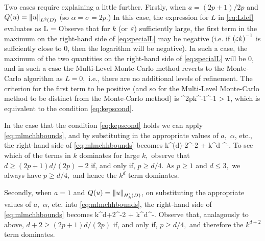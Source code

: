 Two cases require explaining a little further. Firstly, when $a=(2p+1)/2p$ and $Q(u) = \NLtD{u}$ (so $\alpha = \sigma = 2p.$) In this case, the expression for $L$ in \cref{eq:Ldef} evaluates as
  \beq\label{eq:specialL}
  L = \max{}
\eeq
Observe that for $k$ (or $\varepsilon$) sufficiently large, the first term in the maximum on the right-hand side of \cref{eq:specialL} may be negative (i.e. if $\mleft(\eps k\mright)^{-1}$ is suffciently close to 0, then the logarithm will be negative). In such a case, the maximum of the two quantities on the right-hand side of \cref{eq:specialL} will be 0, and in such a case the Multi-Level Monte-Carlo method reverts to the Monte-Carlo algorithm as $L=0,$ i.e., there are no additional levels of refinement. The criterion for the first term to be positive (and so for the Multi-Level Monte-Carlo method to be distinct from the Monte-Carlo method) is
\beqs
{}\co\Ccoarse^{2p}k^{-1}\eps^{-1} > 1,
\eeqs
which is equivalent to the condition \cref{eq:kepscond}.

In the case that the condition \cref{eq:kepscond} holds we can apply \cref{eq:mlmchhbounds}, and by substituting in the appropriate values of $a,$ $\alpha$, etc., the right-hand side of \cref{eq:mlmchhbounds} becomes
\beqs
k^{\mleft(d\mright)-2}\eps^{-2} + k^d \eps^{-}.
\eeqs
To see which of the terms in $k$ dominates for large $k,$ observe that $d \geq (2p+1)d/(2p) -2 $ if, and only if, $p \geq d/4.$ As $p \geq 1$ and $d \leq 3,$ we always have $p \geq d/4,$ and hence the $k^d$ term dominates.

Secondly, when $a=1$ and $Q(u) = \NHokD{u}$, on substituting the appropriate values of $a,$ $\alpha$, etc. into \cref{eq:mlmchhbounds}, the right-hand side of \cref{eq:mlmchhbounds} becomes
\beqs
k^{d+2}\eps^{-2} + k^{d}\eps^{-}.
\eeqs
Observe that, analagously to above, $d + 2 \geq (2p+1)d/(2p)$ if, and only if, $p \geq d/4,$ and therefore the $k^{d+2}$ term dominates.
\epf



